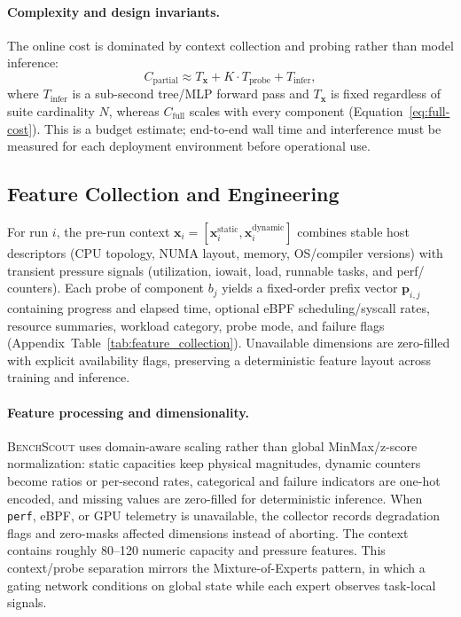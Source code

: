 \documentclass[sigconf, review, anonymous, balance=false]{acmart}
\newcommand{\ourmethod}{\textsc{BenchScout}\xspace}
\begin{document}
\paragraph{Complexity and design invariants.}
The online cost is dominated by context collection and probing rather than model inference:
\begin{equation}
\label{eq:partial-cost}
C_{\mathrm{partial}} \approx T_{\mathbf{x}} + K \cdot T_{\mathrm{probe}} + T_{\mathrm{infer}},
\end{equation}
where $T_{\mathrm{infer}}$ is a sub-second tree/MLP forward pass and $T_{\mathbf{x}}$ is fixed regardless of suite cardinality $N$, whereas $C_{\mathrm{full}}$ scales with every component (Equation~\ref{eq:full-cost}).
This is a budget estimate; end-to-end wall time and interference must be measured for each deployment environment before operational use.

\subsection{Feature Collection and Engineering}
\label{subsec:feature-collection}

For run $i$, the pre-run context $\mathbf{x}_i=[\mathbf{x}_i^{\mathrm{static}},\mathbf{x}_i^{\mathrm{dynamic}}]$ combines stable host descriptors (CPU topology, NUMA layout, memory, OS/compiler versions) with transient pressure signals (utilization, iowait, load, runnable tasks, and perf/ counters).
Each probe of component $b_j$ yields a fixed-order prefix vector $\mathbf{p}_{i,j}$ containing progress and elapsed time, optional eBPF scheduling/syscall rates,  resource summaries, workload category, probe mode, and failure flags (Appendix~Table~\ref{tab:feature_collection}).
Unavailable dimensions are zero-filled with explicit availability flags, preserving a deterministic feature layout across training and inference.

\paragraph{Feature processing and dimensionality.}
\ourmethod uses domain-aware scaling rather than global MinMax/z-score normalization: static capacities keep physical magnitudes, dynamic counters become ratios or per-second rates, categorical and failure indicators are one-hot encoded, and missing values are zero-filled for deterministic inference.
When \texttt{perf}, eBPF, or GPU telemetry is unavailable, the collector records degradation flags and zero-masks affected dimensions instead of aborting. The context contains roughly 80--120 numeric capacity and pressure features.
This context/probe separation mirrors the Mixture-of-Experts pattern, in which a gating network conditions on global state while each expert observes task-local signals.
\end{document}
